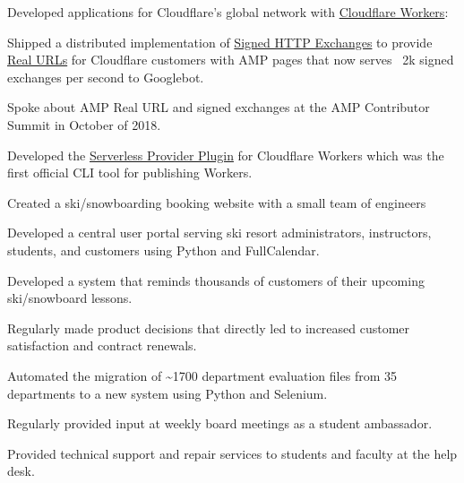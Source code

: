 \documentclass[]{deedy-resume-openfont}
\begin{document}
\vspace{\topsep}
Developed applications for Cloudflare's global network with  \href{https://workers.cloudflare.com}{Cloudflare Workers}:
\begin{tightemize}
\item Shipped a distributed implementation of \href{https://wicg.github.io/webpackage/draft-yasskin-http-origin-signed-responses.html}{Signed HTTP Exchanges} to provide \href{https://www.cloudflare.com/website-optimization/amp-real-url/}{Real URLs} for Cloudflare customers with AMP pages that now serves ~2k signed exchanges per second to Googlebot.
\item Spoke about AMP Real URL and signed exchanges at the AMP Contributor Summit in October of 2018.
\item Developed the \href{https://developers.cloudflare.com/workers/tooling/serverless/}{Serverless Provider Plugin} for Cloudflare Workers which was the first official CLI tool for publishing Workers.
\end{tightemize}
\sectionsep

\vspace{\topsep}
Created a ski/snowboarding booking website with a small team of engineers
\begin{tightemize}
\item Developed a central user portal serving ski resort administrators, instructors, students, and customers using Python and FullCalendar.
\item Developed a system that reminds thousands of customers of their upcoming ski/snowboard lessons.
\item Regularly made product decisions that directly led to increased customer satisfaction and contract renewals.
\end{tightemize}
\sectionsep

\begin{tightemize}
\item Automated the migration of \textasciitilde 1700 department evaluation files from 35 departments to a new system using Python and Selenium.
\item Regularly provided input at weekly board meetings as a student ambassador.
\item Provided technical support and repair services to students and faculty at the help desk.
\end{tightemize}
\sectionsep
\end{document}
